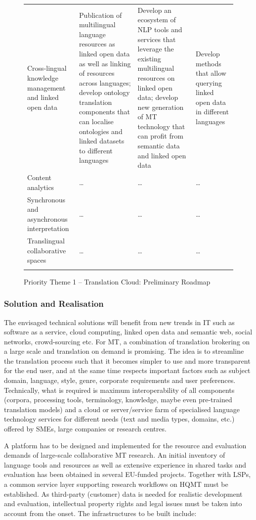 \documentclass[10pt, plain]{../../metanetpaper}
\begin{document}
\begin{multicols}{2}
\begin{figure}[htbp]
\begin{tabular}{@{}p{2.5cm}p{4cm}p{4cm}p{4cm}@{}}
Cross-lingual knowledge management and linked open data & Publication of multilingual language resources as linked open data as well as linking of resources across languages; develop ontology translation components that can localise ontologies and linked datasets to different languages & Develop an ecosystem of NLP tools and services that leverage the existing multilingual resources on linked open data; develop new generation of MT technology that can profit from semantic data and linked open data & Develop methods that allow querying linked open data in different languages \\ \addlinespace
Content analytics & \dots & \dots & \dots \\ \addlinespace
Synchronous and asynchronous interpretation & \dots & \dots & \dots \\ \addlinespace
Translingual collaborative spaces & \dots & \dots & \dots \\ \addlinespace\bottomrule
  \end{tabular}
  \caption{Priority Theme 1 -- Translation Cloud: Preliminary Roadmap}
  \label{fig:pt1-roadmap}
\end{figure}

\subsubsection{Solution and Realisation}
\label{sec:solut-techn-real-pt1}

The envisaged technical solutions will benefit from new trends in IT such as software as a service, cloud computing, linked open data and semantic web, social networks, crowd-sourcing etc. For MT, a combination of translation brokering on a large scale and translation on demand is promising. The idea is to streamline the translation process such that it becomes simpler to use and more transparent for the end user, and at the same time respects important factors such as subject domain, language, style, genre, corporate requirements and user preferences. Technically, what is required is maximum interoperability of all components (corpora, processing tools, terminology, knowledge, maybe even pre-trained translation models) and a cloud or server/service farm of specialised language technology services for different needs (text and media types, domains, etc.) offered by SMEs, large companies or research centres.

A platform has to be designed and implemented for the resource and evaluation demands of large-scale collaborative MT research. An initial inventory of language tools and resources as well as extensive experience in shared tasks and evaluation has been obtained in several EU-funded projects. Together with LSPs, a common service layer supporting research workflows on HQMT must be established. As third-party (customer) data is needed for realistic development and evaluation, intellectual property rights and legal issues must be taken into account from the onset. The infrastructures to be built include:


\end{multicols}
\end{document}
